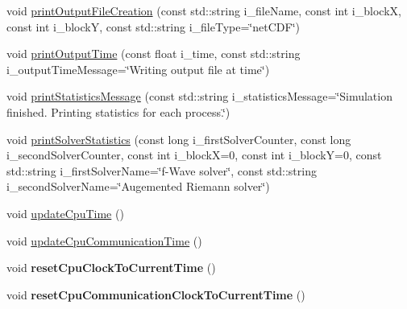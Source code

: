 \begin{DoxyCompactItemize}
\item 
void \hyperlink{classtools_1_1Logger_aec0d76a09748963c9f0b68239e4499c0}{print\-Output\-File\-Creation} (const std\-::string i\-\_\-file\-Name, const int i\-\_\-block\-X, const int i\-\_\-block\-Y, const std\-::string i\-\_\-file\-Type=\char`\"{}net\-C\-D\-F\char`\"{})
\item 
void \hyperlink{classtools_1_1Logger_ab7f380c82631174ff826dfd8bf519058}{print\-Output\-Time} (const float i\-\_\-time, const std\-::string i\-\_\-output\-Time\-Message=\char`\"{}Writing output file at time\char`\"{})
\item 
void \hyperlink{classtools_1_1Logger_a6030321e16a66849dbf237420702a0da}{print\-Statistics\-Message} (const std\-::string i\-\_\-statistics\-Message=\char`\"{}Simulation finished. Printing statistics for each process.\char`\"{})
\item 
void \hyperlink{classtools_1_1Logger_a6f23f0f674d0e7bbf1a52442eff5c031}{print\-Solver\-Statistics} (const long i\-\_\-first\-Solver\-Counter, const long i\-\_\-second\-Solver\-Counter, const int i\-\_\-block\-X=0, const int i\-\_\-block\-Y=0, const std\-::string i\-\_\-first\-Solver\-Name=\char`\"{}f-\/Wave solver\char`\"{}, const std\-::string i\-\_\-second\-Solver\-Name=\char`\"{}Augemented Riemann solver\char`\"{})
\item 
void \hyperlink{classtools_1_1Logger_ad4d9d8616093ec8f86a8c78c5811579a}{update\-Cpu\-Time} ()
\item 
void \hyperlink{classtools_1_1Logger_a2f697ae28a175bcac13fc6662051abd6}{update\-Cpu\-Communication\-Time} ()
\item 
\hypertarget{classtools_1_1Logger_a342dcbb7cbf5aa6b3c2f3a27ad843164}{void {\bfseries reset\-Cpu\-Clock\-To\-Current\-Time} ()}\label{classtools_1_1Logger_a342dcbb7cbf5aa6b3c2f3a27ad843164}

\item 
\hypertarget{classtools_1_1Logger_a3f5039c985e7874ee3ed1ce0e645ab00}{void {\bfseries reset\-Cpu\-Communication\-Clock\-To\-Current\-Time} ()}\label{classtools_1_1Logger_a3f5039c985e7874ee3ed1ce0e645ab00}


\end{DoxyCompactItemize}
